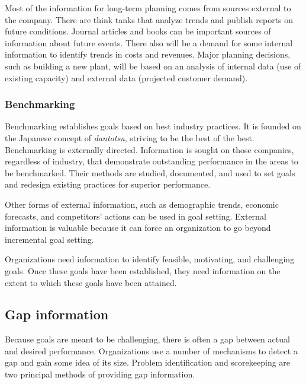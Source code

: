 \documentclass[
]{article}
\begin{document}
Most of the information for long-term planning comes from sources
external to the company. There are think tanks that analyze trends and
publish reports on future conditions. Journal articles and books can be
important sources of information about future events. There also will be
a demand for some internal information to identify trends in costs and
revenues. Major planning decisions, such as building a new plant, will
be based on an analysis of internal data (use of existing capacity) and
external data (projected customer demand).

\hypertarget{benchmarking}{%
\subsubsection*{Benchmarking}\label{benchmarking}}

Benchmarking establishes goals based on best industry practices. It is
founded on the Japanese concept of \emph{dantotsu}, striving to be the best
of the best. Benchmarking is externally directed. Information is sought
on those companies, regardless of industry, that demonstrate outstanding
performance in the areas to be benchmarked. Their methods are studied,
documented, and used to set goals and redesign existing practices for
superior performance.

Other forms of external information, such as demographic trends,
economic forecasts, and competitors' actions can be used in goal
setting. External information is valuable because it can force an
organization to go beyond incremental goal setting.

Organizations need information to identify feasible, motivating, and
challenging goals. Once these goals have been established, they need
information on the extent to which these goals have been attained.

\hypertarget{gap-information}{%
\subsection*{Gap information}\label{gap-information}}

Because goals are meant to be challenging, there is often a gap between
actual and desired performance. Organizations use a number of mechanisms
to detect a gap and gain some idea of its size. Problem identification
and scorekeeping are two principal methods of providing gap information.
\end{document}
